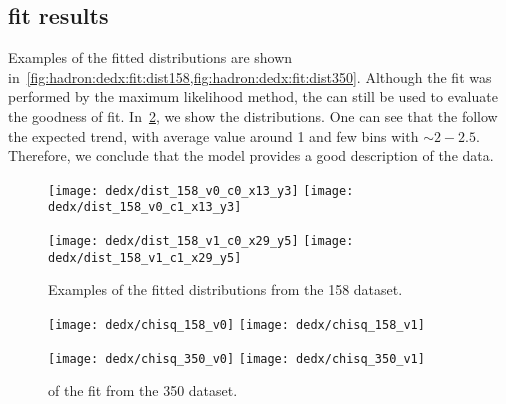 \subsection{\dedx fit results}
\label{sec:hadron:dedx:fitresults}


Examples of the fitted \dedx distributions are shown
in~\cref{fig:hadron:dedx:fit:dist158,fig:hadron:dedx:fit:dist350}.
Although the fit was performed by the maximum likelihood method,
the \redchisq can still be used to evaluate the goodness of fit.
In~\cref{fig:hadron:dedx:fit:chi},
we show the \redchisq distributions.
One can see that the \redchisq follow the expected trend,
with average value around 1 and few bins with \redchisq$\sim2-2.5$.
Therefore, we conclude that the \dedx model
provides a good description of the data.

\begin{figure}
  \centering
  \texttt{[image: dedx/dist\_158\_v0\_c0\_x13\_y3]}
  \texttt{[image: dedx/dist\_158\_v0\_c1\_x13\_y3]}

  \vspace{0.5cm}
  
  \texttt{[image: dedx/dist\_158\_v1\_c0\_x29\_y5]}
  \texttt{[image: dedx/dist\_158\_v1\_c1\_x29\_y5]}
  
  \caption{Examples of the fitted \dedx distributions from the 158 \GeVc dataset.}
  \label{fig:hadron:dedx:fit:dist158}
\end{figure}


\begin{figure}
  \centering
  \texttt{[image: dedx/chisq\_158\_v0]}
  \texttt{[image: dedx/chisq\_158\_v1]}

  \vspace{0.5cm}

  \texttt{[image: dedx/chisq\_350\_v0]}
  \texttt{[image: dedx/chisq\_350\_v1]}
 
  \caption{\redchisq of the \dedx fit from the 350 \GeVc dataset.}
  \label{fig:hadron:dedx:fit:chi}
\end{figure}

